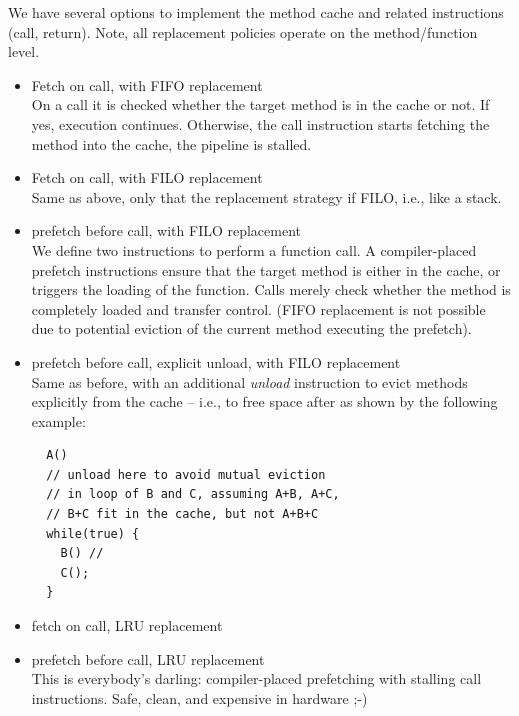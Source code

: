 \documentclass[a4paper,fontsize=10pt,twoside,DIV15,BCOR12mm,headinclude=true,footinclude=false,pagesize,bibtotoc]{scrbook}
\begin{document}
We have several options to implement the method cache and related instructions
(call, return). Note, all replacement policies operate on the method/function
level.
\begin{itemize}
  \item Fetch on call, with FIFO replacement \\
        On a call it is checked whether the target method is in the cache or
        not. If yes, execution continues. Otherwise, the call instruction
        starts fetching the method into the cache, the pipeline is stalled.
  \item Fetch on call, with FILO replacement \\
        Same as above, only that the replacement strategy if FILO, i.e., like a
        stack.
  \item prefetch before call, with FILO replacement \\
        We define two instructions to perform a function call. A compiler-placed
        prefetch instructions ensure that the target method is either in the
        cache, or triggers the loading of the function. Calls merely check
        whether the method is completely loaded and transfer control.
        (FIFO replacement is not possible due to potential eviction of the
        current method executing the prefetch).
  \item prefetch before call, explicit unload, with FILO replacement \\
        Same as before, with an additional \emph{unload} instruction to evict
        methods explicitly from the cache -- i.e., to free space after as shown
        by the following example:
\begin{verbatim}
  A()
  // unload here to avoid mutual eviction
  // in loop of B and C, assuming A+B, A+C,
  // B+C fit in the cache, but not A+B+C
  while(true) {
    B() //
    C();
  }
\end{verbatim}
  \item fetch on call, LRU replacement
  \item prefetch before call, LRU replacement \\
        This is everybody's darling: compiler-placed prefetching with stalling
        call instructions. Safe, clean, and expensive in hardware ;-)
\end{itemize}
\end{document}
